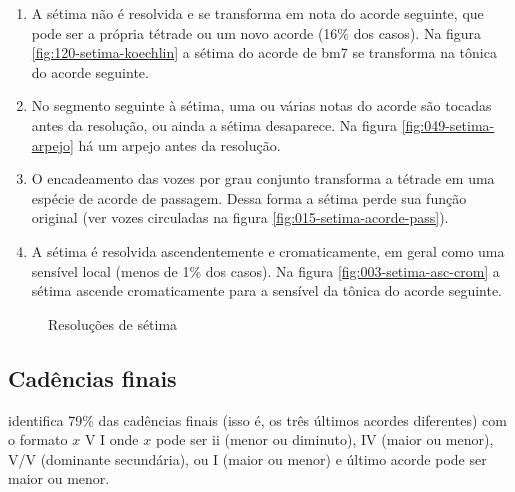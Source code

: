 \begin{enumerate}
\item A sétima não é resolvida e se transforma em nota do acorde
  seguinte, que pode ser a própria tétrade ou um novo acorde (16\% dos
  casos). Na figura \ref{fig:120-setima-koechlin} a sétima do acorde
  de bm7 se transforma na tônica do acorde seguinte.
\item No segmento seguinte à sétima, uma ou várias notas do acorde são
  tocadas antes da resolução, ou ainda a sétima desaparece. Na figura
  \ref{fig:049-setima-arpejo} há um arpejo antes da resolução.
\item O encadeamento das vozes por grau conjunto transforma a tétrade
  em uma espécie de acorde de passagem. Dessa forma a sétima perde sua
  função original (ver vozes circuladas na figura
  \ref{fig:015-setima-acorde-pass}).
\item A sétima é resolvida ascendentemente e cromaticamente, em geral
  como uma sensível local (menos de 1\% dos casos). Na figura
  \ref{fig:003-setima-asc-crom} a sétima ascende cromaticamente para a
  sensível da tônica do acorde seguinte.
\end{enumerate}

\begin{figure}
  \centering
  \caption{Resoluções de sétima}
  \label{fig:setima-resol}
\end{figure}

\subsection{Cadências finais}
\label{sec:cadencias}

\rameau{} identifica 79\% das cadências finais (isso é, os três
últimos acordes diferentes) com o formato $x$ V I onde $x$ pode ser ii
(menor ou diminuto), IV (maior ou menor), V/V (dominante secundária),
ou I (maior ou menor) e último acorde pode ser maior ou menor.

